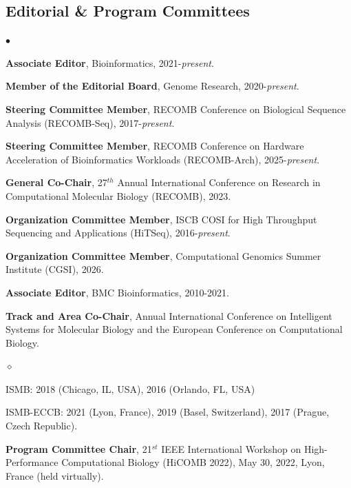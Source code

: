 \documentclass[margin,line]{res}
\newenvironment{list2}{
  \begin{list}{$\bullet$}{%
      \setlength{\itemsep}{0.1cm}
      \setlength{\parsep}{0in} \setlength{\parskip}{0in}
      \setlength{\topsep}{0in} \setlength{\partopsep}{0in} 
      \setlength{\leftmargin}{0.2in}}}{\end{list}}
\newenvironment{list3}{
  \begin{list}{$\diamond$}{%
      \setlength{\itemsep}{0in}
      \setlength{\parsep}{0.1cm} \setlength{\parskip}{0.1cm}
      \setlength{\topsep}{0.1cm} \setlength{\partopsep}{0.1cm} 
      \setlength{\leftmargin}{0.2in}}}{\end{list}}
\begin{document}
\begin{resume}
\subsection{\small \sc Editorial \& Program Committees}
\begin{list2}
    \item
        \textbf{Associate Editor}, Bioinformatics, 2021-\textit{present}.

    \item
        \textbf{Member of the Editorial Board}, Genome Research, 2020-\textit{present}.

    \item
        \textbf{Steering Committee Member}, RECOMB Conference on Biological Sequence Analysis (RECOMB-Seq), 2017-{\it present}.

    \item
        \textbf{Steering Committee Member}, RECOMB Conference on Hardware Acceleration of Bioinformatics Workloads (RECOMB-Arch), 2025-{\it present}.


    \item
        \textbf{General Co-Chair}, 27$^{th}$ Annual International Conference on Research in Computational Molecular Biology (RECOMB), 2023.

    \item
        \textbf{Organization Committee Member}, ISCB COSI for High Throughput Sequencing and Applications (HiTSeq), 2016-{\it present}.

    \item
        \textbf{Organization Committee Member}, Computational Genomics Summer Institute (CGSI), 2026.

    \item
        \textbf{Associate Editor}, BMC Bioinformatics, 2010-2021.

    \item
        \textbf{Track and Area Co-Chair}, Annual International Conference on Intelligent Systems for Molecular Biology and the European Conference on 
        Computational Biology.
        \begin{list3}
            \item ISMB: 2018 (Chicago, IL, USA), 2016 (Orlando, FL, USA)
            \item ISMB-ECCB: 2021 (Lyon, France), 2019 (Basel, Switzerland), 2017 (Prague, Czech Republic).
        \end{list3}
    
    \item 
        \textbf{Program Committee Chair}, 21$^{st}$ IEEE International Workshop on High-Performance Computational Biology (HiCOMB 2022), May 30, 2022, Lyon, France (held virtually).
        

\end{list2}
\end{resume}
\end{document}
